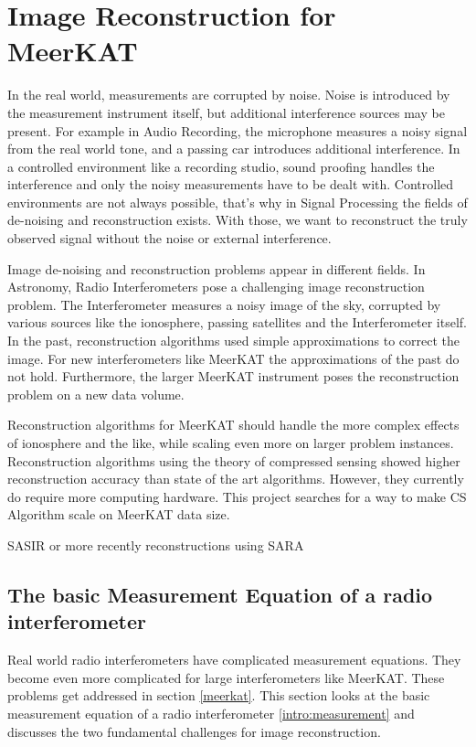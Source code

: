 \section{Image Reconstruction for MeerKAT} \label{intro}
In the real world, measurements are corrupted by noise. Noise is introduced by the measurement instrument itself, but additional interference sources may be present. For example in Audio Recording, the microphone measures a noisy signal from the real world tone, and a passing car introduces additional interference. In a controlled environment like a recording studio, sound proofing handles the interference and only the noisy measurements have to be dealt with. Controlled environments are not always possible, that's why in Signal Processing the fields of de-noising and reconstruction exists. With those, we want to reconstruct the truly observed signal without the noise or external interference.

Image de-noising and reconstruction problems appear in different fields. In Astronomy, Radio Interferometers pose a challenging image reconstruction problem. The Interferometer measures a noisy image of the sky, corrupted by various sources like the ionosphere, passing satellites and the Interferometer itself. In the past, reconstruction algorithms used simple approximations to correct the image. For new interferometers like MeerKAT the approximations of the past do not hold. Furthermore, the larger MeerKAT instrument poses the reconstruction problem on a new data volume. 

Reconstruction algorithms for MeerKAT should handle the more complex effects of ionosphere and the like, while scaling even more on larger problem instances. Reconstruction algorithms using the theory of compressed sensing\cite{candes2006robust}\cite{donoho2006compressed} showed higher reconstruction accuracy than state of the art algorithms. However, they currently do require more computing hardware. This project searches for a way to make CS Algorithm scale on MeerKAT data size.

SASIR\cite{starck2015starlet} or more recently reconstructions using SARA \cite{dabbech2018cygnus} \cite{birdi2018sparse}

\subsection{The basic Measurement Equation of a radio interferometer}
Real world radio interferometers have complicated measurement equations. They become even more complicated for large interferometers like MeerKAT. These problems get addressed in section \ref{meerkat}. This section looks at the basic measurement equation of a radio interferometer \eqref{intro:measurement} and discusses the two fundamental challenges for image reconstruction. 

